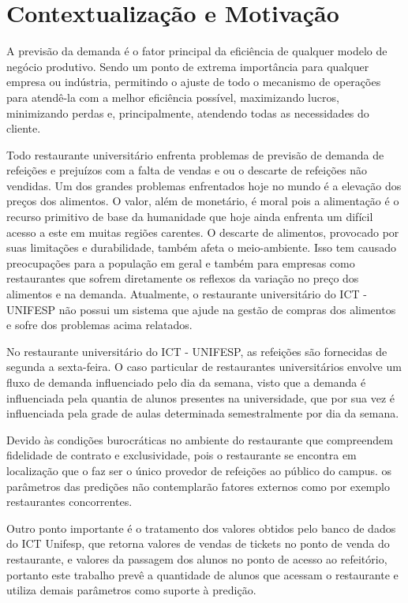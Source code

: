 \documentclass[	12pt, Times, openright, twoside, a4paper, english, brazil]{abntex2}
\begin{document}
      \section{Contextualização e Motivação}

        \noindent 
        A previsão da demanda é o fator principal da eficiência de qualquer modelo de negócio produtivo. Sendo um ponto de extrema importância para qualquer empresa ou indústria, permitindo o ajuste de todo o mecanismo de operações para atendê-la com a melhor eficiência possível, maximizando lucros, minimizando perdas e, principalmente, atendendo todas as necessidades do cliente.
        
        Todo restaurante universitário enfrenta problemas de previsão de demanda de refeições e prejuízos com a falta de vendas e ou o descarte de refeições não vendidas. Um dos grandes problemas enfrentados hoje no mundo é a elevação dos preços dos alimentos. O valor, além de monetário, é moral pois a alimentação é o recurso primitivo de base da humanidade que hoje ainda enfrenta um difícil acesso a este em muitas regiões carentes. O descarte de alimentos, provocado por suas limitações e durabilidade, também afeta o meio-ambiente. Isso tem causado preocupações para a população em geral e também para empresas como restaurantes que sofrem diretamente os reflexos da variação no preço dos alimentos e na demanda. Atualmente, o restaurante universitário do ICT - UNIFESP não possui um sistema que ajude na gestão de compras dos alimentos e sofre dos problemas acima relatados.

        No restaurante universitário do ICT - UNIFESP, as refeições são fornecidas de segunda a sexta-feira. O caso particular de restaurantes universitários envolve um fluxo de demanda influenciado pelo dia da semana, visto que a demanda é influenciada pela quantia de alunos presentes na universidade, que por sua vez é influenciada pela grade de aulas determinada semestralmente por dia da semana. 
        
        Devido às condições burocráticas no ambiente do restaurante que compreendem fidelidade de contrato e exclusividade, pois o restaurante se encontra em localização que o faz ser o único provedor de refeições ao público do campus. os parâmetros das predições não contemplarão fatores externos como por exemplo restaurantes concorrentes.

        Outro ponto importante é o tratamento dos valores obtidos pelo banco de dados do ICT Unifesp, que retorna valores de vendas de tickets no ponto de venda do restaurante, e valores da passagem dos alunos no ponto de acesso ao refeitório, portanto  este trabalho prevê a quantidade de alunos que acessam o restaurante  e  utiliza demais parâmetros  como suporte à predição.
\end{document}
